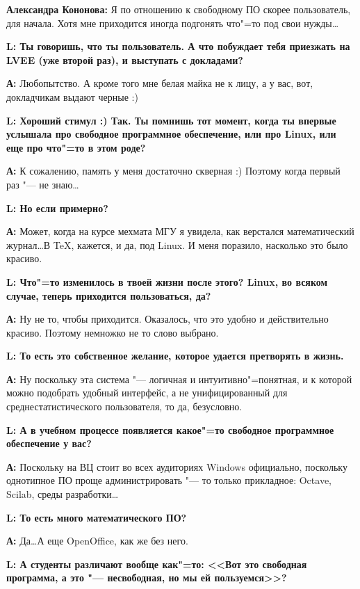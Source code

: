 \documentclass[10pt, a5paper]{article}
\begin{document}
{\noindent \bf Александра Кононова:} Я по отношению к свободному ПО скорее пользователь, для начала. Хотя мне приходится иногда подгонять что"=то под свои нужды\ldots

{\noindent \bf L: Ты говоришь, что ты пользователь. А что побуждает тебя приезжать на LVEE (уже второй раз), и выступать с докладами?}

{\noindent \bf А:} Любопытство. А кроме того мне белая майка не к лицу, а у вас, вот, докладчикам выдают черные :)

{\noindent \bf L: Хороший стимул :) Так. Ты помнишь тот момент, когда ты впервые услышала про свободное программное обеспечение, или про Linux, или еще про что"=то в этом роде?}

{\noindent \bf А:} К сожалению, память у меня достаточно скверная :) Поэтому когда первый раз "--- не знаю\ldots

{\noindent \bf L: Но если примерно?}

{\noindent \bf А:} Может, когда на курсе мехмата МГУ я увидела, как верстался математический журнал\ldots В \TeX, кажется, и да, под Linux. И меня поразило, насколько это было красиво.

{\noindent \bf L: Что"=то изменилось в твоей жизни после этого? Linux, во всяком случае, теперь приходится пользоваться, да?}

{\noindent \bf А:} Ну не то, чтобы приходится. Оказалось, что это удобно и действительно красиво. Поэтому немножко не то слово выбрано. 

{\noindent \bf L: То есть это собственное желание, которое удается претворять в жизнь.}

{\noindent \bf А:} Ну поскольку эта система "--- логичная и интуитивно"=понятная, и к которой можно подобрать удобный интерфейс, а не унифицированный для среднестатистического пользователя, то да, безусловно. 

{\noindent \bf L: А в учебном процессе появляется какое"=то свободное программное обеспечение у вас?}

{\noindent \bf А:} Поскольку на ВЦ стоит во всех аудиториях Windows официально, поскольку однотипное ПО проще администрировать "--- то только прикладное: Octave, Scilab, среды разработки\ldots

{\noindent \bf L: То есть много математического ПО?}

{\noindent \bf А:} Да\ldots А еще OpenOffice, как же без него.

{\noindent \bf L: А студенты различают вообще как"=то: <<Вот это свободная программа, а это "--- несвободная, но мы ей пользуемся>>?}
\end{document}
